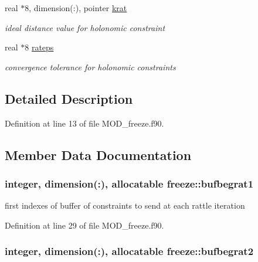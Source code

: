\begin{DoxyCompactItemize}
real $\ast$8, dimension(\-:), pointer \hyperlink{classfreeze_a04f100032ce74e94a2c4845299dc9f6b}{krat}
\begin{DoxyCompactList}\small\item\em ideal distance value for holonomic constraint \end{DoxyCompactList}\item 
real $\ast$8 \hyperlink{classfreeze_aa4d3247ab1f305e1059bd93bbb33e394}{rateps}
\begin{DoxyCompactList}\small\item\em convergence tolerance for holonomic constraints \end{DoxyCompactList}\end{DoxyCompactItemize}


\subsection{Detailed Description}


Definition at line 13 of file M\-O\-D\-\_\-freeze.\-f90.



\subsection{Member Data Documentation}
\hypertarget{classfreeze_abf03e0ad8c7616beb64a0246d4ff5f27}{
\subsubsection[{bufbegrat1}]{\setlength{\rightskip}{0pt plus 5cm}integer, dimension(\-:), allocatable freeze\-::bufbegrat1}}\label{classfreeze_abf03e0ad8c7616beb64a0246d4ff5f27}


first indexes of buffer of constraints to send at each rattle iteration 



Definition at line 29 of file M\-O\-D\-\_\-freeze.\-f90.

\hypertarget{classfreeze_abae423316a32486c4f872f881ee1159e}{
\subsubsection[{bufbegrat2}]{\setlength{\rightskip}{0pt plus 5cm}integer, dimension(\-:), allocatable freeze\-::bufbegrat2}}\label{classfreeze_abae423316a32486c4f872f881ee1159e}


